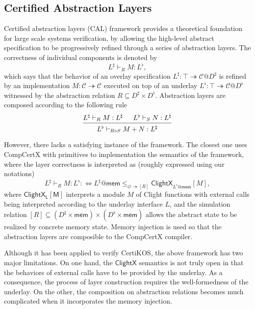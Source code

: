 \documentclass[acmsmall,screen,review,anonymous]{acmart}
\newcommand{\kw}[1]{\ensuremath{ \mathsf{#1} }}
\begin{document}
\subsection{Certified Abstraction Layers}

Certified abstraction layers (CAL) framework
provides a theoretical foundation
for large scale systems verification,
by allowing
the high-level abstract specification
to be progressively refined
through a series of abstraction layers.
The correctness of individual components is denoted by
\[
  L^\sharp \vdash_R M : L^\flat,
\]
which says that
the behavior of an overlay specification $L^\sharp: \top \twoheadrightarrow \mathcal{C} @ D^\sharp$
is refined by an implementation $M: \mathcal{C} \twoheadrightarrow \mathcal{C}$
executed on top of an underlay $L^\flat: \top \twoheadrightarrow \mathcal{C} @ D^\flat$
witnessed by the abstraction relation $R \subseteq D^\sharp \times D^\flat$.
Abstraction layers are composed according to the following rule
\[
  \begin{prooftree}
    \hypo{L^\natural \vdash_R M : L^\sharp}
    \hypo{L^\flat \vdash_S N : L^\natural}
    \infer2{L^\flat \vdash_{R \circ S} M + N : L^\sharp}
  \end{prooftree}
\]

However, there lacks a satisfying instance of the framework.
The closest one uses CompCertX with primitives
to implementation the semantics of the framework,
where the layer correctness is interpreted as
(roughly expressed using our notations)
\[
  L^\sharp \vdash_R M : L^\flat :\Leftrightarrow L^\sharp @ \kw{mem} \le_{\varnothing \twoheadrightarrow [R]} \kw{ClightX}_{L^\flat @ \kw{mem}} [M],
\]
where $\kw{ClightX_L[M]}$ interprets
a module $M$ of Clight functions
with external calls being interpreted
according to the underlay interface $L$,
and the simulation relation $[R] \subseteq (D^\sharp \times \kw{mem}) \times (D^\flat \times \kw{mem})$
allows the abstract state to be realized
by concrete memory state.
Memory injection is used so that the abstraction layers
are composible to the CompCertX compiler.

Although it has been applied to verify CertiKOS,
the above framework has two major limitations.
On one hand,
the $\kw{ClightX}$ semantics is not truly open
in that the behaviors of external calls have to be provided by the underlay.
As a consequence,
the process of layer construction requires
the well-formedness of the underlay.
On the other,
the composition on abstraction relations
becomes much complicated
when it incorporates the memory injection.
\end{document}
